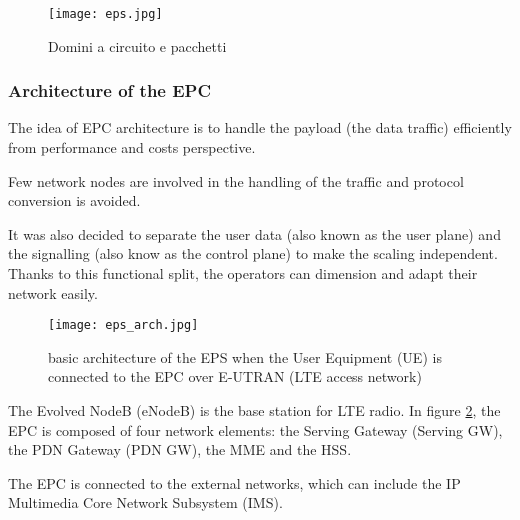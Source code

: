 \begin{figure}[H]
  \centering
  \texttt{[image: eps.jpg]}
  \caption{Domini a circuito e pacchetti}
  \label{fig:eps}
\end{figure}

\subsubsection{Architecture of the EPC}

The idea of EPC architecture is to handle the payload (the data traffic)
efficiently from performance and costs perspective.

Few network nodes are involved in the handling of the traffic and protocol
conversion is avoided.

It was also decided to separate the user data (also known as the user plane)
and the signalling (also know as the control plane) to make the scaling
independent.
Thanks to this functional split, the operators can dimension and adapt their
network easily.

\begin{figure}[H]
  \centering
  \texttt{[image: eps\_arch.jpg]}
  \caption{basic architecture of the EPS when the User Equipment
(UE) is connected to the EPC over E-UTRAN (LTE access network)}
  \label{fig:eps_arch}
\end{figure}

The Evolved NodeB (eNodeB) is the base station for LTE radio.
In figure \ref{fig:eps_arch}, the EPC is composed of four network elements:
the Serving Gateway (Serving GW), the PDN Gateway (PDN GW), the MME and
the HSS.

The EPC is connected to the external networks, which can include the IP
Multimedia Core Network Subsystem (IMS).
